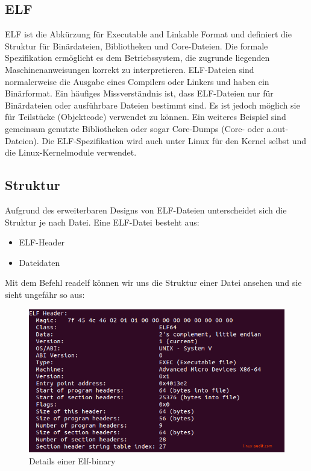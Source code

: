 \subsection{ELF}
ELF ist die Abkürzung für Executable and Linkable Format und definiert die Struktur für Binärdateien, Bibliotheken und Core-Dateien. Die formale Spezifikation ermöglicht es dem Betriebssystem, die zugrunde liegenden Maschinenanweisungen korrekt zu interpretieren. ELF-Dateien sind normalerweise die Ausgabe eines Compilers oder Linkers und haben ein Binärformat.
\newline
\newline
Ein häufiges Missverständnis ist, dass ELF-Dateien nur für Binärdateien oder ausführbare Dateien bestimmt sind. Es ist jedoch möglich sie für Teilstücke (Objektcode) verwendet zu können. Ein weiteres Beispiel sind gemeinsam genutzte Bibliotheken oder sogar Core-Dumps (Core- oder a.out-Dateien). Die ELF-Spezifikation wird auch unter Linux für den Kernel selbst und die Linux-Kernelmodule verwendet.


\subsection{Struktur}
Aufgrund des erweiterbaren Designs von ELF-Dateien unterscheidet sich die Struktur je nach Datei. Eine ELF-Datei besteht aus:

\begin{itemize} 
\item ELF-Header
\item Dateidaten
\end{itemize}

Mit dem Befehl readelf können wir uns die Struktur einer Datei ansehen und sie sieht ungefähr so aus:

\begin{figure}[H]
    \begin{center}
        \includegraphics[scale=0.5]{images/elf-header-linux-binary.png}
        \caption{Details einer Elf-binary \cite{details_of_Elf_binary}}
    \end{center}
\end{figure}
 
